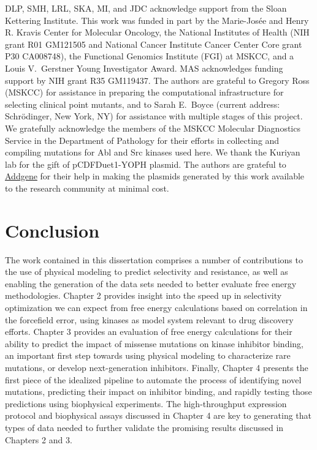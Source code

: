 \documentclass[phd,tocprelim]{cornell}
\begin{document}
DLP, SMH, LRL, SKA, MI, and JDC acknowledge support from the Sloan Kettering Institute.
This work was funded in part by the Marie-Josée and Henry R. Kravis Center for Molecular Oncology, the National Institutes of Health (NIH grant R01 GM121505 and National Cancer Institute Cancer Center Core grant P30 CA008748), the Functional Genomics Institute (FGI) at MSKCC, and a Louis V.~Gerstner Young Investigator Award. 
MAS acknowledges funding support by NIH grant R35 GM119437. 
The authors are grateful to Gregory Ross (MSKCC) for assistance in preparing the computational infrastructure for selecting clinical point mutants, and to Sarah E.~Boyce (current address: Schr\"{o}dinger, New York, NY) for assistance with multiple stages of this project.
We gratefully acknowledge the members of the MSKCC Molecular Diagnostics Service in the Department of Pathology for their efforts in collecting and compiling mutations for Abl and Src kinases used here.
We thank the Kuriyan lab for the gift of pCDFDuet1-YOPH plasmid.
The authors are grateful to \href{http://www.addgene.org}{Addgene} for their help in making the plasmids generated by this work available to the research community at minimal cost.


\chapter{Conclusion}

The work contained in this dissertation comprises a number of contributions to the use of physical modeling to predict selectivity and resistance, as well as enabling the generation of the data sets needed to better evaluate free energy methodologies. Chapter 2 provides insight into the speed up in selectivity optimization we can expect from free energy calculations based on correlation in the forcefield error, using kinases as model system relevant to drug discovery efforts. Chapter 3 provides an evaluation of free energy calculations for their ability to predict the impact of missense mutations on kinase inhibitor binding, an important first step towards using physical modeling to characterize rare mutations, or develop next-generation inhibitors. Finally, Chapter 4 presents the first piece of the idealized pipeline to automate the process of identifying novel mutations, predicting their impact on inhibitor binding, and rapidly testing those predictions using biophysical experiments. The high-throughput expression protocol and biophysical assays discussed in Chapter 4 are key to generating that types of data needed to further validate the promising results discussed in Chapters 2 and 3. 
\end{document}
